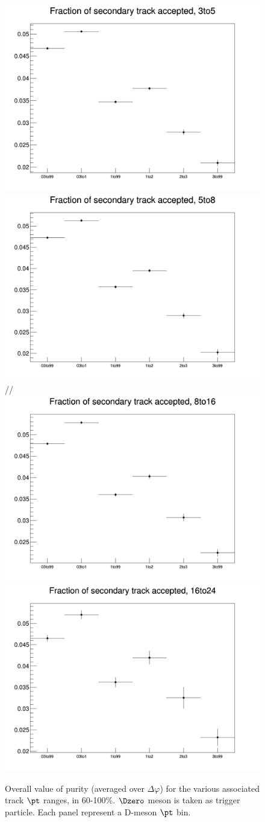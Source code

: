 \begin{figure}
\centering
{\includegraphics[width=0.45\linewidth]{figuresVsCent/Global/Purity/Output_Plots_60_100_DCA100/FractOfSecOverTotal_3to5.png}}
{\includegraphics[width=0.45\linewidth]{figuresVsCent/Global/Purity/Output_Plots_60_100_DCA100/FractOfSecOverTotal_5to8.png}} //
{\includegraphics[width=0.45\linewidth]{figuresVsCent/Global/Purity/Output_Plots_60_100_DCA100/FractOfSecOverTotal_8to16.png}}
{\includegraphics[width=0.45\linewidth]{figuresVsCent/Global/Purity/Output_Plots_60_100_DCA100/FractOfSecOverTotal_16to24.png}}
 \caption{Overall value of purity (averaged over $\Delta\varphi$) for the various associated track $\pt$ ranges, in 60-100\%. $\Dzero$ meson is taken as trigger particle. Each panel represent a D-meson $\pt$ bin.}
\label{fig:PurityFlat60100}
\end{figure}

